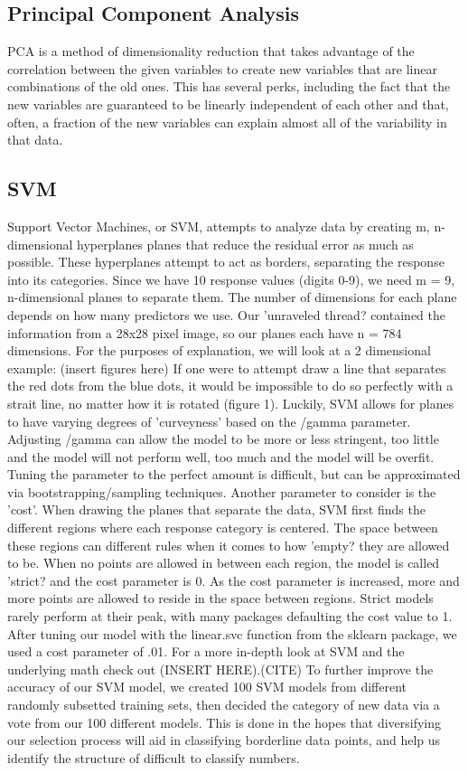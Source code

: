 \documentclass[11pt, oneside]{article}   	%
\begin{document}
\subsection{Principal Component Analysis}
PCA is a method of dimensionality reduction that takes advantage of the correlation between the given variables to create new variables that are linear combinations of the old ones. This has several perks, including the fact that the new variables are guaranteed to be linearly independent of each other and that, often, a fraction of the new variables can explain almost all of the variability in that data. 
\subsection{SVM}
Support Vector Machines, or SVM, attempts to analyze data by creating m, n-dimensional hyperplanes planes that reduce the residual error as much as possible. These hyperplanes attempt to act as borders, separating the response into its categories. Since we have 10 response values (digits 0-9), we need m = 9, n-dimensional planes to separate them. The number of dimensions for each plane depends on how many predictors we use. Our 'unraveled thread? contained the information from a 28x28 pixel image, so our planes each have n = 784 dimensions. For the purposes of explanation, we will look at a 2 dimensional example: (insert figures here) If one were to attempt draw a line that separates the red dots from the blue dots, it would be impossible to do so perfectly with a strait line, no matter how it is rotated (figure 1). Luckily, SVM allows for planes to have varying degrees of 'curveyness' based on the /gamma parameter. Adjusting /gamma can allow the model to be more or less stringent, too little and the model will not perform well, too much and the model will be overfit. Tuning the parameter to the perfect amount is difficult, but can be approximated via bootstrapping/sampling techniques. Another parameter to consider is the 'cost'. When drawing the planes that separate the data, SVM first finds the different regions where each response category is centered. The space between these regions can different rules when it comes to how 'empty? they are allowed to be. When no points are allowed in between each region, the model is called 'strict?  and the cost parameter is 0. As the cost parameter is increased, more and more points are allowed to reside in the space between regions. Strict models rarely perform at their peak, with many packages defaulting the cost value to 1. After tuning our model with the linear.svc function from the sklearn package, we used a cost parameter of .01. For a more in-depth look at SVM and the underlying math check out (INSERT HERE).(CITE)
To further improve the accuracy of our SVM model, we created 100 SVM models from different randomly subsetted training sets, then decided the category of new data via a vote from our 100 different models. This is done in the hopes that diversifying our selection process will aid in classifying borderline data points, and help us identify the structure of difficult to classify numbers.
\end{document}
